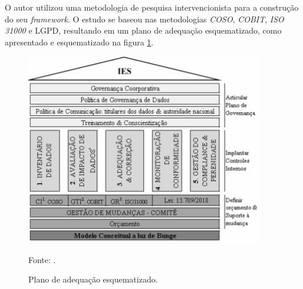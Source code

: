 \documentclass[
	12pt,				%
	openright,			%
	oneside,			%
	a4paper,			%
	english,			%
	french,				%
	spanish,			%
	brazil,				%
	]{abntex2}
\begin{document}

O autor utilizou uma metodologia de pesquisa intervencionista para a construção do seu \textit{framework}. O estudo se baseou nas metodologias \textit{COSO}, \textit{COBIT}, \textit{ISO 31000} e LGPD, resultando em um plano de adequação esquematizado, como apresentado e esquematizado na figura \ref{fig: silva2}.


\begin{figure}[ht]
    \centering
    \caption{Plano de adequação esquematizado.}
    \includegraphics[width=4.1in]{Images/13Silva2020.png}
    \label{fig: silva2}
    
    \centering \small Fonte: .
\end{figure}
\end{document}
